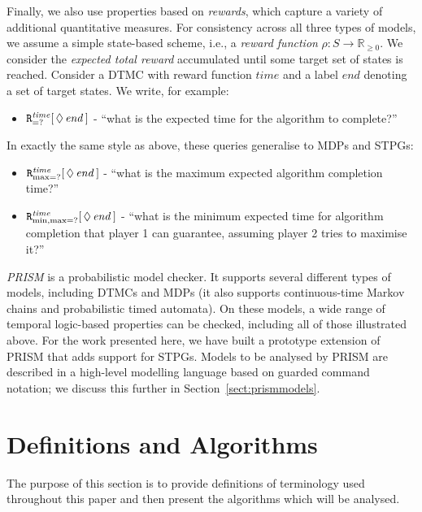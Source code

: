 \documentclass{llncs}
\def\Rsetgeq{\mathbb{R}_{\geq 0}}
\begin{document}
Finally, we also use properties based on \emph{rewards},
which capture a variety of additional quantitative measures.
For consistency across all three types of models,
we assume a simple state-based scheme,
i.e., a \emph{reward function} $\rho:S\rightarrow\Rsetgeq$.
We consider the \emph{expected total reward} accumulated until some target set of states is reached.
Consider a DTMC with reward function $\mathit{time}$
and a label $\mathit{end}$ denoting a set of target states.
We write, for example:
\vspace{-5pt}
\begin{itemize}
\item ${\tt R}^{\mathit{time}}_{=?}[\,\Diamond\,\mathit{end}\,]$ -
``what is the expected time for the algorithm to complete?''
\end{itemize}
\vspace{-5pt}
In exactly the same style as above, these queries generalise to MDPs and STPGs: %
\vspace{-5pt}
\begin{itemize}\addtolength{\itemsep}{2pt}
\item ${\tt R}^{\mathit{time}}_{\max=?}[\,\Diamond\,\mathit{end}\,]$ -
``what is the maximum expected algorithm completion time?''
\item ${\tt R}^{\mathit{time}}_{\min,\max=?}[\,\Diamond\,\mathit{end}\,]$ -
``what is the minimum expected time for algorithm completion
that player 1 can guarantee, assuming player 2 tries to maximise it?''
\end{itemize}
\vspace{-5pt}
\emph{PRISM} \cite{KNP11} is a probabilistic model checker.
It supports several different types of models, including DTMCs and MDPs
(it also supports continuous-time Markov chains and probabilistic timed automata).
On these models, a wide range of temporal logic-based properties can be checked,
including all of those illustrated above.
For the work presented here, we have built a prototype extension of PRISM
that adds support for STPGs.
Models to be analysed by PRISM are described in a
high-level modelling language based on guarded command notation;
we discuss this further in Section~\ref{sect:prismmodels}.
\vspace{-10pt}
\section{Definitions and Algorithms}
\vspace{-10pt}
The purpose of this section is to provide definitions of terminology
used throughout this paper and then present the algorithms which will be analysed.
\vspace{-10pt}
\end{document}
